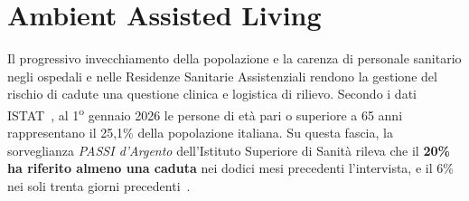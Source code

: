 %
%
%

\section{Ambient Assisted Living}

Il progressivo invecchiamento della popolazione e la carenza di personale sanitario negli ospedali e nelle Residenze Sanitarie Assistenziali rendono la gestione del rischio di cadute una questione clinica e logistica di rilievo. Secondo i dati ISTAT~\cite{istat2026}, al 1\textsuperscript{o} gennaio 2026 le persone di età pari o superiore a 65 anni rappresentano il 25,1\% della popolazione italiana. Su questa fascia, la sorveglianza \emph{PASSI d'Argento} dell'Istituto Superiore di Sanità rileva che il \textbf{20\% ha riferito almeno una caduta} nei dodici mesi precedenti l'intervista, e il 6\% nei soli trenta giorni precedenti~\cite{passi}.


